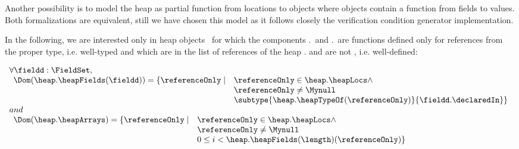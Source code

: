  Another possibility is to model the heap as partial function from locations to objects where objects contain a function from 
 fields to values. Both formalizations are equivalent, still we have chosen this model as it follows closely the
 verification condition generator implementation.

 In the following, we are interested only in  heap objects \heap \ for which the components
 \heap.\heapFields \ and \heap.\heapArrays \ are functions defined only for references from the proper
 type, i.e. well-typed and which are in the list of references of the heap \heap.\heapLocs{} and are not \Mynull, i.e. well-defined: 

  $$\begin{array}{l}
           \forall  \fieldd : \FieldSet,   \\
   \begin{array}{ll} 
   \Dom( \heap.\heapFields(\fieldd))  =    \{ \referenceOnly \mid &	
                \referenceOnly  \in \heap.\heapLocs  \wedge \\
 	        &  \referenceOnly \neq \Mynull\\
  	        & \subtype{ \heap.\heapTypeOf(\referenceOnly ) }{\fieldd.\declaredIn} \}  
     \end{array}
	  \\
 	  and  \\
 	  \begin{array}{ll}  \Dom (\heap.\heapArrays) = \{  \referenceOnly \mid 	&  \referenceOnly  \in  \heap.\heapLocs \wedge \\ 
 	  &  \referenceOnly \neq \Mynull\\
 	  &  0 \leq i < \heap.\heapFields( \length)( \referenceOnly)   \}  
     \end{array}
 	 
    \end{array}
   $$

%	 


